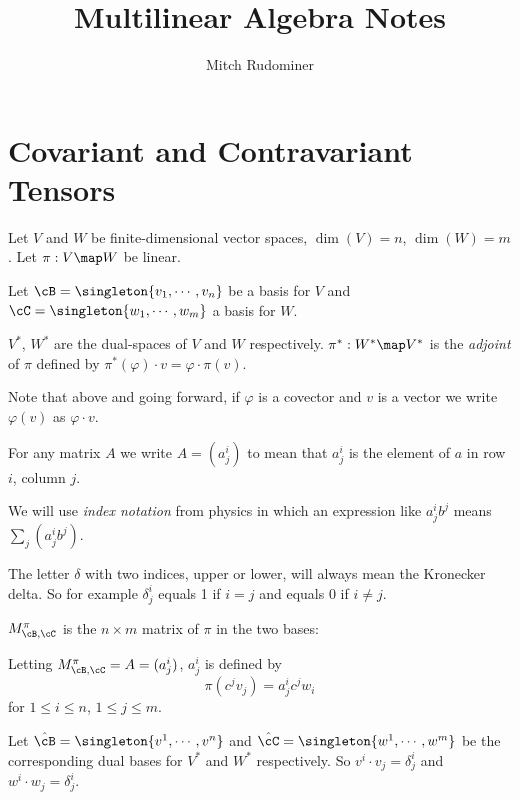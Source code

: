 \documentclass[oneside,12pt]{amsart}
\begin{document}
\title{Multilinear Algebra Notes}
\author{Mitch Rudominer}

\maketitle

\tableofcontents


\section{Covariant and Contravariant Tensors}

Let $V$ and $W$ be finite-dimensional vector spaces, 
$\dim(V)=n$, $\dim(W) = m$. Let $\pi:V\map W$ be linear.

Let $\cB = \singleton{v_1,\cdots,v_n}$ be a basis for $V$ and
$\cC=\singleton{w_1,\cdots,w_m}$ a basis for $W$.

\begin{definition}
$V^*$, $W^*$ are the dual-spaces of $V$ and $W$ respectively.
$\pi^*:W^*\map V^*$ is the \emph{adjoint} of $\pi$ defined by
$\pi^*(\varphi) \cdot v = \varphi \cdot \pi(v)$.
\end{definition}

Note that above and going forward, if
$\varphi$ is a covector and $v$ is a vector we write $\varphi(v)$
as $\varphi \cdot v$.

\begin{definition}
 For any matrix $A$ we write $A=(a^i_j)$ to mean that $a^i_j$ is the
 element of $a$ in row $i$, column $j$. 
\end{definition}


We will use \emph{index notation} from physics in which an expression
like $a^i_j b^j$ means $\sum_j(a^i_j b^j)$.

The letter $\delta$ with two indices, upper or lower, will always mean the Kronecker delta. So for example $\delta^i_j$ equals 1 if $i=j$ and equals 0 if $i\neq j$. 

\begin{definition}
$M^{\pi}_{\cB,\cC}$ is the $n\times m$ matrix of $\pi$ in
the two bases:


 Letting $M^{\pi}_{\cB,\cC}=A=(a^i_j)$,
$a^i_j$ is defined by
$$\pi(c^jv_j) = a^i_j c^j w_i$$
for $1\leq i \leq n$, $1\leq j \leq m$.
\end{definition}

Let
$\hat{\cB} = \singleton{v^1,\cdots,v^n}$ and
$\hat{\cC} = \singleton{w^1,\cdots,w^m}$ be the corresponding
dual bases for $V^*$ and $W^*$ respectively. 
So $v^i \cdot v_j = \delta^i_j$ and $w^i \cdot w_j = \delta^i_j$.
\end{document}
